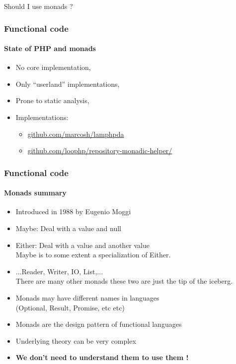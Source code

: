 \begin{frame}
  \centering
  \Huge Should I use monads ?

\end{frame}

\begin{frame}
  \frametitle{Functional code}
  \framesubtitle{State of PHP and monads}

  \begin{itemize}[<+->]
    \item No core implementation,
    \item Only ``userland'' implementations,
    \item Prone to static analysis,
    \item Implementations:
          \begin{itemize}[<+->]
            \item \href{https://github.com/marcosh/lamphpda}{github.com/marcosh/lamphpda}
            \item \href{https://github.com/loophp/repository-monadic-helper/}{github.com/loophp/repository-monadic-helper/}
          \end{itemize}
  \end{itemize}
\end{frame}

\begin{frame}
  \frametitle{Functional code}
  \framesubtitle{Monads summary}

  \begin{itemize}[<+->]
    \item Introduced in 1988 by Eugenio Moggi
    \item Maybe: Deal with a value and null
    \item Either: Deal with a value and another value
          \\\textcolor{ecgrey!50}{Maybe is to some extent a specialization of Either.}
    \item ...Reader, Writer, IO, List,...
          \\\textcolor{ecgrey!50}{There are many other monads these
            two are just the tip of the iceberg.}
    \item Monads may have different names in languages
          \\\textcolor{ecgrey!50}{(Optional, Result, Promise, etc etc)}
    \item Monads are the design pattern of functional languages
    \item Underlying theory can be very complex
    \item \textbf{We don't need to understand them to use them !}
  \end{itemize}
\end{frame}

